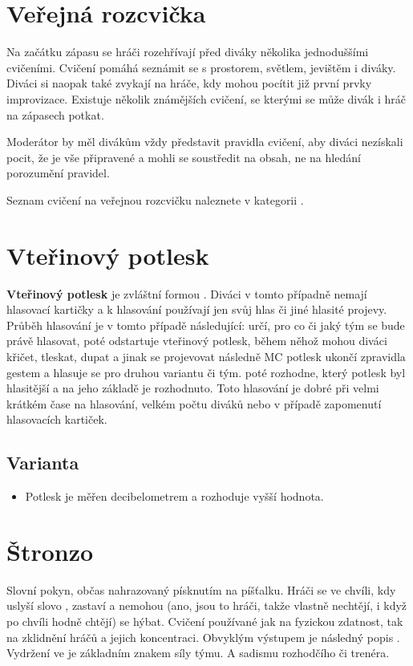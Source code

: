 \documentclass[main.tex]{subfiles}
\begin{document}
 
 
 
\needspace{5cm} \section{Veřejná rozcvička} \label{veřejná rozcvička} Na začátku zápasu se hráči rozehřívají před diváky několika jednoduššími cvičeními. Cvičení pomáhá seznámit se s prostorem, světlem, jevištěm i diváky. 
Diváci si naopak také zvykají na hráče, kdy mohou pocítit již první prvky improvizace. 
Existuje několik známějších cvičení, se kterými se může divák i hráč na zápasech potkat. 
 
Moderátor by měl divákům vždy představit pravidla cvičení, aby diváci nezískali pocit, že je vše připravené a mohli se soustředit na obsah, ne na hledání porozumění pravidel. 
 
Seznam cvičení na veřejnou rozcvičku naleznete v kategorii . 
 
 
\needspace{5cm} \section{Vteřinový potlesk} \label{vteřinový potlesk} \textbf{Vteřinový potlesk}{} je zvláštní formou . Diváci v tomto případně nemají hlasovací kartičky a k hlasování používají jen svůj hlas či jiné hlasité projevy. Průběh hlasování je v tomto případě následující:  určí, pro co či jaký tým se bude právě hlasovat, poté odstartuje vteřinový potlesk, během něhož mohou diváci křičet, tleskat, dupat a jinak se projevovat následně MC potlesk ukončí zpravidla gestem a hlasuje se pro druhou variantu či tým.  poté rozhodne, který potlesk byl hlasitější a na jeho základě je rozhodnuto. Toto hlasování je dobré při velmi krátkém čase na hlasování, velkém počtu diváků nebo v případě zapomenutí hlasovacích kartiček. 
 
\subsection{ Varianta } \begin{itemize}
\item Potlesk je měřen decibelometrem a rozhoduje vyšší hodnota.
\end{itemize}
 
 
 
\needspace{5cm} \section{Štronzo} \label{štronzo} Slovní pokyn, občas nahrazovaný písknutím na píšťalku. Hráči se ve chvíli, kdy uslyší slovo , zastaví a nemohou (ano, jsou to hráči, takže vlastně nechtějí, i když po chvíli hodně chtějí) se hýbat. Cvičení používané jak na fyzickou zdatnost, tak na zklidnění hráčů a jejich koncentraci. Obvyklým výstupem je následný popis . Vydržení ve  je základním znakem síly týmu. A sadismu rozhodčího či trenéra. 
 
\end{document}
